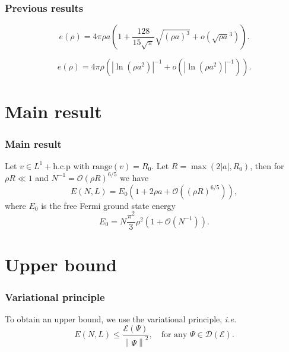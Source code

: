 \documentclass{beamer}[10]
\newcommand{\norm}[1]{\left\lVert #1 \right\rVert}
\newcommand{\abs}[1]{\left\lvert #1 \right\rvert}
\newcommand{\ie}{\emph{i.e.} }
\begin{document}
\begin{frame}
\frametitle{Previous results}
\begin{block}{}
	\begin{Theorem}[3d result]
		\begin{equation}
		e(\rho)=4\pi\rho a\left(1+\frac{128}{15\sqrt{\pi}}\sqrt{(\rho a)^3}+o(\sqrt{\rho a}^3)\right).
		\end{equation}
	\end{Theorem}

	\begin{theorem}[2d result]
		\begin{equation}
		e(\rho)=4\pi \rho\left(\abs{\ln(\rho a^2)}^{-1}+o(\abs{\ln(\rho a^2)}^{-1})\right) .
		\end{equation}
	\end{theorem}
\end{block}
\end{frame}


\section{Main result}

\begin{frame}
	\frametitle{Main result}
	\begin{block}{}
		\begin{theorem}
			Let $ v\in L^{1}+\text{h.c.p} $ with $ \text{range}(v)=R_0 $. Let $ R=\max(2\abs{a},R_0) $, then for $ \rho R\ll 1  $ and $ N^{-1}=\mathcal{O}(\rho R)^{6/5} $ we have \begin{equation}
			E(N,L)=E_0\left(1+2\rho a+ \mathcal{O}\left((\rho R)^{6/5}\right)\right),
			\end{equation} 
			where $ E_0 $ is the free Fermi ground state energy\begin{equation}
			E_0=N\frac{\pi^2}{3}\rho^2\left(1+\mathcal{O}(N^{-1})\right).
			\end{equation}
		\end{theorem}
	\end{block}	
\end{frame}



\section{Upper bound}

\begin{frame}
	\frametitle{Variational principle}
	\begin{block}{}
		To obtain an upper bound, we use the variational principle, \ie
		$$
		E(N,L)\leq \frac{\mathcal{E}(\Psi)}{\norm{\Psi}^2},\quad \text{for any }  \Psi\in \mathcal{D}(\mathcal{E}) .
		$$
	\end{block}	
\end{frame}
\end{document}

